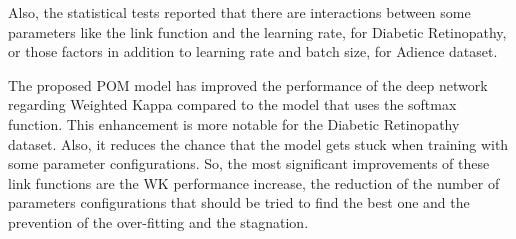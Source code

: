 \documentclass[journal]{IEEEtran}
\begin{document}
	Also, the statistical tests reported that there are interactions between some parameters like the link function and the learning rate, for Diabetic Retinopathy, or those factors in addition to learning rate and batch size, for Adience dataset.
	
	The proposed POM model has improved the performance of the deep network regarding Weighted Kappa compared to the model that uses the softmax function. This enhancement is more notable for the Diabetic Retinopathy dataset. Also, it reduces the chance that the model gets stuck when training with some parameter configurations. So, the most significant improvements of these link functions are the WK performance increase, the reduction of the number of parameters configurations that should be tried to find the best one and the prevention of the over-fitting and the stagnation.
	
	
	
	
	

	
	
	\ifCLASSOPTIONcaptionsoff
	\newpage
	\fi
	
	
	
	
\end{document}
